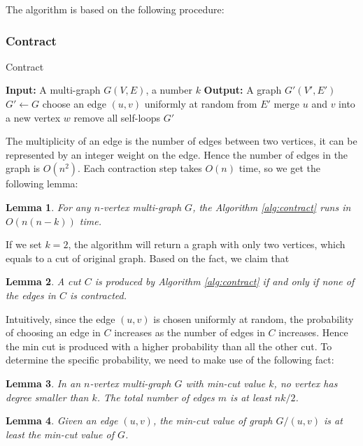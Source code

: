 \documentclass[12pt]{article}
\newtheorem{lemma}{Lemma}
\begin{document}
The algorithm is based on the following procedure:
\subsubsection{Contract}
\begin{algorithm}
\caption{Contract}
\label{alg:contract}
\begin{algorithmic}
    \STATE \textbf{Input:} A multi-graph $G(V,E)$, a number $k$
    \STATE \textbf{Output:} A graph $G'(V',E')$
    \STATE $G'\leftarrow G$
    \STATE choose an edge $(u,v)$ uniformly at random from $E'$
    \STATE merge $u$ and $v$ into a new vertex $w$
    \STATE remove all self-loops
    \ENDWHILE
    \RETURN $G'$
\end{algorithmic}
\end{algorithm}
The multiplicity of an edge is the number of edges between two vertices, it can be represented by an integer weight on the edge. Hence the number of edges in the graph is $O(n^2)$. Each contraction step takes $O(n)$ time, so we get the following lemma:

\begin{lemma}
    For any $n$-vertex multi-graph $G$, the Algorithm \ref{alg:contract} runs in $O(n(n-k))$ time.
\end{lemma}

If we set $k=2$, the algorithm will return a graph with only two vertices, which equals to a cut of original graph. Based on the fact, we claim that

\begin{lemma}
    \label{lemma:cut}
    A cut $C$ is produced by Algorithm \ref{alg:contract} if and only if none of the edges in $C$ is contracted.
\end{lemma}

Intuitively, since the edge $(u,v)$ is chosen uniformly at random, the probability of choosing an edge in $C$ increases as the number of edges in $C$ increases. Hence the min cut is produced with a higher probability than all the other cut. To determine the specific probability, we need to make use of the following fact:

\begin{lemma}
    \label{lemma:degree}
    In an $n$-vertex multi-graph $G$ with min-cut value $k$, no vertex has degree smaller than $k$. The total number of edges $m$ is at least $nk/2$.
\end{lemma}

\begin{lemma}
    \label{lemma:contract}
    Given an edge $(u,v)$, the min-cut value of graph $G/(u,v)$ is at least the min-cut value of $G$.
\end{lemma}
\end{document}
